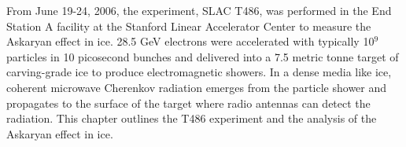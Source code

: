From June 19-24, 2006, the experiment, SLAC T486, was performed in the End Station A facility at the Stanford Linear Accelerator Center to measure the Askaryan effect in ice.  28.5 GeV electrons were accelerated with typically 10$^9$ particles in 10 picosecond bunches and delivered into a 7.5 metric tonne target of carving-grade ice to produce electromagnetic showers.  In a dense media like ice, coherent microwave Cherenkov radiation emerges from the particle shower and propagates to the surface of the target where radio antennas can detect the radiation.  This chapter outlines the T486 experiment and the analysis of the Askaryan effect in ice.
